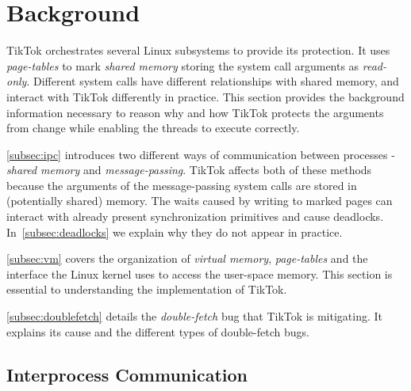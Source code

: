\documentclass[conference]{IEEEtran}
\newcommand{\sysname}{TikTok}
\begin{document}
\section{Background}
\label{sec:background}

\sysname{} orchestrates several Linux subsystems to provide its protection. It
uses \emph{page-tables} to mark \emph{shared memory} storing the system call
arguments as \emph{read-only}. Different system calls have different
relationships with shared memory, and interact with \sysname{} differently in
practice. This section provides the background information necessary to reason
why and how \sysname{} protects the arguments from change while enabling the
threads to execute correctly.

\autoref{subsec:ipc} introduces two different ways of communication between
processes - \emph{shared memory} and \emph{message-passing}. \sysname{} affects
both of these methods because the arguments of the message-passing system calls
are stored in (potentially shared) memory. The waits caused by writing to marked
pages can interact with already present synchronization primitives and cause
deadlocks. In~\autoref{subsec:deadlocks} we explain why they do not appear in
practice.

\autoref{subsec:vm} covers the organization of \emph{virtual memory},
\emph{page-tables} and the interface the Linux kernel uses to access the
user-space memory. This section is essential to understanding the implementation
of \sysname.

\autoref{subsec:doublefetch} details the \emph{double-fetch} bug that \sysname{}
is mitigating. It explains its cause and the different types of double-fetch bugs.


\subsection{Interprocess Communication}
\label{subsec:ipc}
\end{document}
